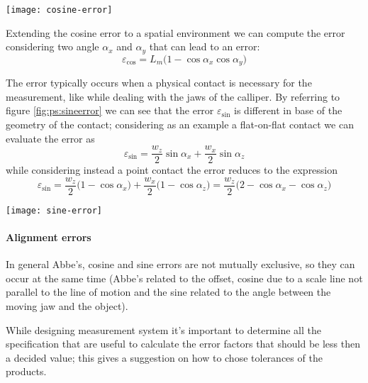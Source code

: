 	\begin{SCfigure}[1.3][bht]
		\centering
		\texttt{[image: cosine-error]}
		\caption{cosine error on a length measure.}  \label{fig:ps:cosineerror}
	\end{SCfigure}
	Extending the cosine error to a spatial environment we can compute  the error considering two angle $\alpha_x$ and $\alpha_y$ that can lead to an error:
	\begin{equation}
		\varepsilon_{\cos} = L_m\big(1-\cos\alpha_x\cos\alpha_y\big)
	\end{equation}
	\vspace{3mm}
	
	The  error typically occurs when a physical contact is necessary for the measurement, like while dealing with the jaws of the calliper. By referring to figure \ref{fig:ps:sineerror} we can see that the error $\varepsilon_{\sin}$ is different in base of the geometry of the contact; considering as an example a flat-on-flat contact we can evaluate the error as
	\begin{equation}
		\varepsilon_{\sin} = \frac {w_z}2\sin\alpha_x + \frac{w_x}{2}\sin \alpha_z
	\end{equation}
	while considering instead a point contact the error reduces to the expression
	\begin{equation}
		\varepsilon_{\sin} = \frac {w_z}2\big(1-\cos\alpha_x\big) + \frac{w_x}{2}\big(1-\cos\alpha_z\big) = \frac{w_z}{2}\big(2-\cos\alpha_x-\cos\alpha_z\big)
	\end{equation}	
	
	
	\begin{SCfigure}[1.3][bht]
		\centering
		\texttt{[image: sine-error]}
		\caption{sine error on a surface measure considering a flat-on-flat contact $(a)$ or a point contact $(b)$.}  \label{fig:ps:sineerror}
	\end{SCfigure}

	\paragraph{Alignment errors} In general Abbe's, cosine and sine errors are not mutually exclusive, so they can occur at the same time (Abbe's related to the offset, cosine due to a scale line not parallel to the  line of motion and the sine related to the angle between the moving jaw and the object).
	
	While designing measurement system it's important to determine all the specification that are useful to calculate the error factors that should be less then a decided value; this gives a suggestion on how to chose tolerances of the products.
	
